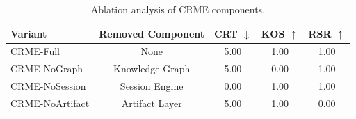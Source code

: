 \begin{table}[t]
\caption{Ablation analysis of CRME components.}
\label{tab:ablation}
\centering
\begin{tabular}{lcccc}
\hline
\textbf{Variant} &
\textbf{Removed Component} &
\textbf{CRT} $\downarrow$ &
\textbf{KOS} $\uparrow$ &
\textbf{RSR} $\uparrow$ \\
\hline

CRME-Full &
None &
5.00 &
1.00 &
1.00 \\

CRME-NoGraph &
Knowledge Graph &
5.00 &
0.00 &
1.00 \\

CRME-NoSession &
Session Engine &
0.00 &
1.00 &
1.00 \\

CRME-NoArtifact &
Artifact Layer &
5.00 &
1.00 &
0.00 \\

\hline
\end{tabular}
\end{table}


